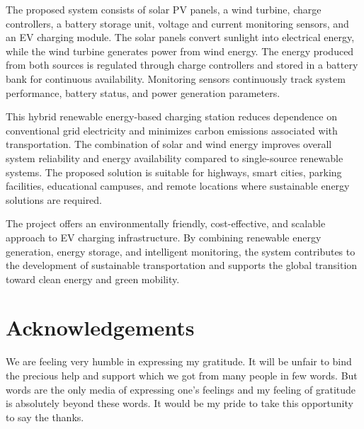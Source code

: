 \documentclass[12pt]{report}
\begin{document}
\begin{Certificatepage}
\begin{center}
\begin{justify}
The proposed system consists of solar PV panels, a wind turbine, charge controllers, a battery storage unit, voltage and current monitoring sensors, and an EV charging module. The solar panels convert sunlight into electrical energy, while the wind turbine generates power from wind energy. The energy produced from both sources is regulated through charge controllers and stored in a battery bank for continuous availability. Monitoring sensors continuously track system performance, battery status, and power generation parameters.\vspace{0.5cm} %

This hybrid renewable energy-based charging station reduces dependence on conventional grid electricity and minimizes carbon emissions associated with transportation. The combination of solar and wind energy improves overall system reliability and energy availability compared to single-source renewable systems. The proposed solution is suitable for highways, smart cities, parking facilities, educational campuses, and remote locations where sustainable energy solutions are required.\vspace{0.5cm} %

The project offers an environmentally friendly, cost-effective, and scalable approach to EV charging infrastructure. By combining renewable energy generation, energy storage, and intelligent monitoring, the system contributes to the development of sustainable transportation and supports the global transition toward clean energy and green mobility.
 
\newpage


\chapter*{Acknowledgements}

\setlength{\parindent}{0pt} %

We are feeling very humble in expressing my gratitude. It will be unfair to bind the precious help and support which we got from many people in few words. But words are the only media of expressing one’s feelings and my feeling of gratitude is absolutely beyond these words. It would be my pride to take this opportunity to say the thanks.  

\vspace{0.5cm} %


\end{justify}
\end{center}
\end{Certificatepage}
\end{document}
